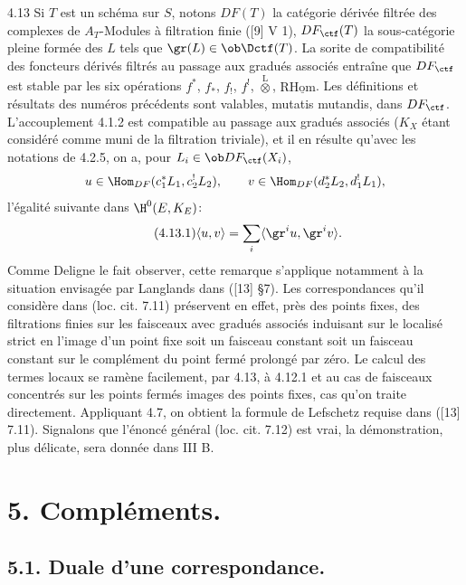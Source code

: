 \begin{statement}{4.13}
Si $T$ est un schéma sur $S$, notons $DF(T)$ la catégorie dérivée filtrée des complexes de $A_T$-Modules à filtration finie ([9] V 1), $DF_{\ctf}(T)$ la sous-catégorie pleine formée des $L$ tels que $\gr(L)\in\ob\Dctf(T)$. La sorite de compatibilité des foncteurs dérivés filtrés au passage aux gradués associés entraîne que $DF_{\ctf}$ est stable par les six opérations $f^*$, $f_*$, $f_!$, $f^!$, $\overset{\mathrm{L}}{\otimes}$, $\mathrm{R}\underline{\mathrm{Hom}}$. Les définitions et résultats des numéros précédents sont valables, mutatis mutandis, dans $DF_{\ctf}$. L'accouplement 4.1.2 est compatible au passage aux gradués associés ($K_X$ étant considéré comme muni de la filtration triviale), et il en résulte qu'avec les notations de 4.2.5, on a, pour $L_i\in\ob DF_{\ctf}(X_i)$,
\[
u\in\Hom_{DF}(c_1^*L_1,c_2^!L_2),\qquad
v\in\Hom_{DF}(d_2^*L_2,d_1^!L_1),
\]
l'égalité suivante dans $\H^0(E,K_E)$:
\begin{equation}
\tag{4.13.1}
\langle u,v\rangle=\sum_i\langle \gr^i u,\gr^i v\rangle.
\end{equation}
Comme Deligne le fait observer, cette remarque s'applique notamment à la situation envisagée par Langlands dans ([13] §7). Les correspondances qu'il considère dans (loc. cit. 7.11) préservent en effet, près des points fixes, des filtrations finies sur les faisceaux avec gradués associés induisant sur le localisé strict en l'image d'un point fixe soit un faisceau constant soit un faisceau constant sur le complément du point fermé prolongé par zéro. Le calcul des termes locaux se ramène facilement, par 4.13, à 4.12.1 et au cas de faisceaux concentrés sur les points fermés images des points fixes, cas qu'on traite directement. Appliquant 4.7, on obtient la formule de Lefschetz requise dans ([13] 7.11). Signalons que l'énoncé général (loc. cit. 7.12) est vrai, la démonstration, plus délicate, sera donnée dans III B.
\end{statement}



\section*{5. Compléments.}

\subsection*{5.1. Duale d'une correspondance.}


